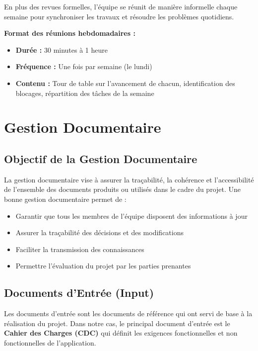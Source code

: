 \documentclass[12pt,a4paper]{report}
\begin{document}
En plus des revues formelles, l'équipe se réunit de manière informelle chaque semaine pour synchroniser les travaux et résoudre les problèmes quotidiens.

\textbf{Format des réunions hebdomadaires :}
\begin{itemize}
    \item \textbf{Durée :} 30 minutes à 1 heure
    \item \textbf{Fréquence :} Une fois par semaine (le lundi)
    \item \textbf{Contenu :} Tour de table sur l'avancement de chacun, identification des blocages, répartition des tâches de la semaine
\end{itemize}

\newpage

\chapter{Gestion Documentaire}

\section{Objectif de la Gestion Documentaire}

La gestion documentaire vise à assurer la traçabilité, la cohérence et l'accessibilité de l'ensemble des documents produits ou utilisés dans le cadre du projet. Une bonne gestion documentaire permet de :

\begin{itemize}
    \item Garantir que tous les membres de l'équipe disposent des informations à jour
    \item Assurer la traçabilité des décisions et des modifications
    \item Faciliter la transmission des connaissances
    \item Permettre l'évaluation du projet par les parties prenantes
\end{itemize}

\section{Documents d'Entrée (Input)}

Les documents d'entrée sont les documents de référence qui ont servi de base à la réalisation du projet. Dans notre cas, le principal document d'entrée est le \textbf{Cahier des Charges (CDC)} qui définit les exigences fonctionnelles et non fonctionnelles de l'application.
\end{document}
